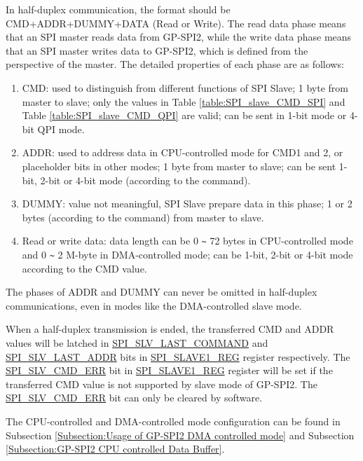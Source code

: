 \documentclass[main\_\_EN.tex]{subfiles}
\begin{document}
In half-duplex communication, the format should be CMD+ADDR+DUMMY+DATA (Read or Write). The read data phase means that an SPI master reads data from GP-SPI2, while the write data phase means that an SPI master writes data to GP-SPI2, which is defined from the perspective of the master. The detailed properties of each phase are as follows:

\begin{enumerate}
   \item CMD: used to distinguish from different functions of SPI Slave; 1 byte from master to slave; only the values in Table \ref{table:SPI_slave_CMD_SPI} and Table \ref{table:SPI_slave_CMD_QPI} are valid; can be sent in 1-bit mode or 4-bit QPI mode.
   \item ADDR: used to address data in CPU-controlled mode for CMD1 and 2, or placeholder bits in other modes; 1 byte from master to slave; can be sent 1-bit, 2-bit or 4-bit mode (according to the command).
   \item DUMMY: value not meaningful, SPI Slave prepare data in this phase; 1 or 2 bytes (according to the command) from master to slave.

   \item Read or write data: data length can be 0 \verb+~+ 72 bytes in CPU-controlled mode and 0 \verb+~+ 2 M-byte in DMA-controlled mode; can be  1-bit, 2-bit or 4-bit mode according to the CMD value.
   \end{enumerate}

The phases of ADDR and DUMMY can never be omitted in half-duplex communications, even in modes like the DMA-controlled slave mode.

When a half-duplex transmission is ended, the transferred CMD and ADDR values will be latched in \hyperref[fielddesc:SPISLVLASTCOMMAND]{SPI\_SLV\_LAST\_COMMAND} and \hyperref[fielddesc:SPISLVLASTADDR]{SPI\_SLV\_LAST\_ADDR} bits in \hyperref[regdesc:SPISLAVE1REG]{SPI\_SLAVE1\_REG} register respectively. The \hyperref[fielddesc:SPISLVCMDERR]{SPI\_SLV\_CMD\_ERR} bit in \hyperref[regdesc:SPISLAVE1REG]{SPI\_SLAVE1\_REG} register will be set if the transferred CMD value is not supported by slave mode of GP-SPI2. The \hyperref[fielddesc:SPISLVCMDERR]{SPI\_SLV\_CMD\_ERR} bit can only be cleared by software.

The CPU-controlled and DMA-controlled mode configuration can be found in Subsection \ref{Subsection:Usage of GP-SPI2 DMA controlled mode} and Subsection \ref{Subsection:GP-SPI2 CPU controlled Data Buffer}.
\end{document}
